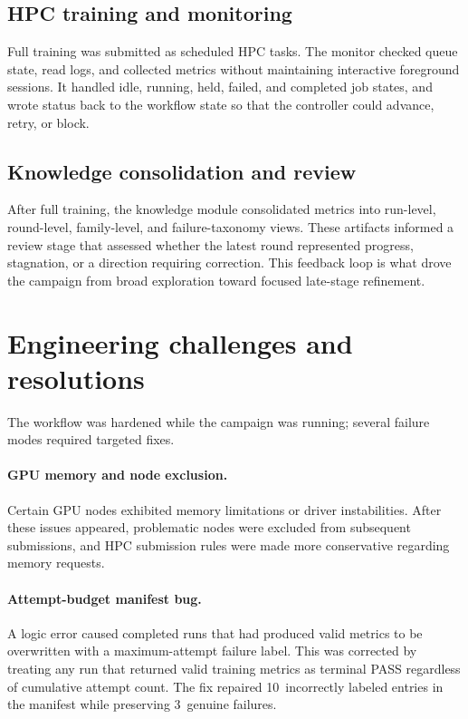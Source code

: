 ﻿\documentclass[preprint,12pt,authoryear]{elsarticle}
\begin{document}
\subsection{HPC training and monitoring}
\label{sec:monitor}

Full training was submitted as scheduled HPC tasks.
The monitor checked queue state, read logs, and collected metrics without maintaining interactive foreground sessions.
It handled idle, running, held, failed, and completed job states, and wrote status back to the workflow state so that the controller could advance, retry, or block.

\subsection{Knowledge consolidation and review}
\label{sec:review}

After full training, the knowledge module consolidated metrics into run-level, round-level, family-level, and failure-taxonomy views.
These artifacts informed a review stage that assessed whether the latest round represented progress, stagnation, or a direction requiring correction.
This feedback loop is what drove the campaign from broad exploration toward focused late-stage refinement.

\section{Engineering challenges and resolutions}
\label{sec:engineering}

The workflow was hardened while the campaign was running; several failure modes required targeted fixes.

\paragraph{GPU memory and node exclusion.}
Certain GPU nodes exhibited memory limitations or driver instabilities.
After these issues appeared, problematic nodes were excluded from subsequent submissions, and HPC submission rules were made more conservative regarding memory requests.

\paragraph{Attempt-budget manifest bug.}
A logic error caused completed runs that had produced valid metrics to be overwritten with a maximum-attempt failure label.
This was corrected by treating any run that returned valid training metrics as terminal PASS regardless of cumulative attempt count.
The fix repaired 10~incorrectly labeled entries in the manifest while preserving 3~genuine failures.
\end{document}
